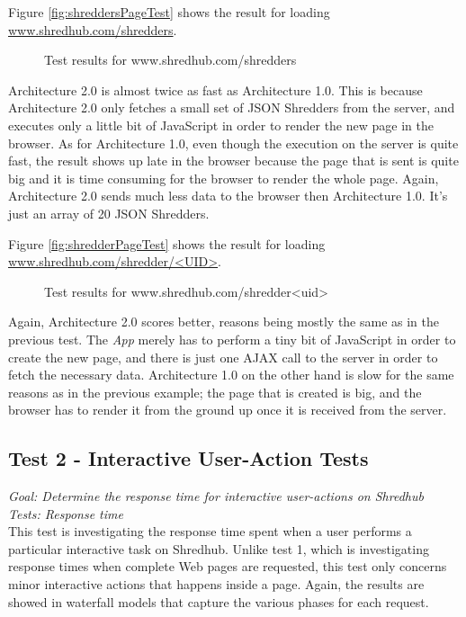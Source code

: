 Figure \vref{fig:shreddersPageTest}
shows the result for loading 
\url{www.shredhub.com/shredders}.
\begin{figure}
\begin{center}
\end{center}
\caption{Test results for www.shredhub.com/shredders}\label{fig:shreddersPageTest}
\end{figure}
Architecture 2.0 is almost twice as fast as Architecture 1.0. This is because Architecture 2.0 only fetches a small set of JSON Shredders from the server, and executes only a little bit of JavaScript in order to render the new page in the browser.  As for Architecture 1.0, even though the execution on the server is quite fast, the result shows up late in the browser  because the page that is sent is quite big and it is time consuming for the browser to render the whole page. Again, Architecture 2.0 sends much less data to the browser then Architecture 1.0. It's just an array of 20 JSON Shredders.

Figure \vref{fig:shredderPageTest}
shows the result for loading 
\url{www.shredhub.com/shredder/<UID>}.
\begin{figure}
\begin{center}
\end{center}
\caption{Test results for www.shredhub.com/shredder<uid>}\label{fig:shredderPageTest}
\end{figure}
Again, Architecture 2.0 scores better, reasons being mostly the same as in the previous test. The \textit{App} merely has to perform a tiny bit of JavaScript in order to create the new page, and there is just one AJAX call to the server in order to fetch the necessary data. Architecture 1.0 on the other hand is slow for the same reasons as in the previous example; the page that is created is big, and the browser has to render it from the ground up once it is received from the server. 

\subsection{Test 2 - Interactive User-Action Tests}
\textit{Goal: Determine the response time for interactive user-actions on Shredhub} \\
\textit{Tests: Response time}\\
This test is investigating the response time spent when a user performs a particular interactive task on Shredhub. Unlike test 1, which is investigating response times when complete Web pages are requested, this test only concerns minor interactive actions that happens inside a page. Again, the results are showed in waterfall models that capture the various phases for each request. 

